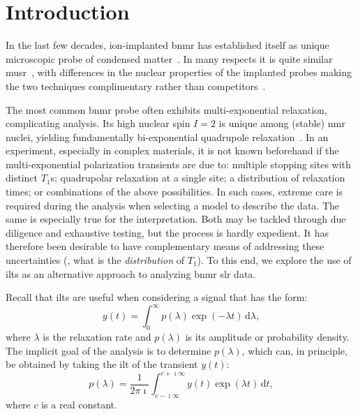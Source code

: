 \section{Introduction \label{sec:introduction}}

In the last few decades, ion-implanted \gls{bnmr} has established itself as unique microscopic probe of condensed matter~\cite{2015-MacFarlane-SSNMR-68-1}.
In many respects it is quite similar \gls{musr}~\cite{2004-Bakule-CP-45-203, 2011-Yaouanc-MSR},
with differences in the nuclear properties of the implanted probes making the two techniques complimentary rather than competitors~\cite{2000-Kiefl-PB-289-640}.

The most common \gls{bnmr} probe  often exhibits multi-exponential relaxation, complicating analysis.
Its high nuclear spin $I = 2$ is unique among (stable) \gls{nmr} nuclei, yielding fundamentally bi-exponential quadrupole relaxation~\cite{1970-Hubbard-JCP-53-985, 1982-Becker-ZNA-37-697, 1985-Korblein-JPFMP-15-561}.
In an experiment, especially in complex materials, it is not known beforehand if the multi-exponential polarization transients are due to:
multiple  stopping sites with distinct $T_{1}$s;
quadrupolar relaxation at a single site;
a distribution of relaxation times;
or combinations of the above possibilities.
In such cases, extreme care is required during the analysis when selecting a model to describe the data.
The same is especially true for the interpretation.
Both may be tackled through due diligence and exhaustive testing, but the process is hardly expedient.
It has therefore been desirable to have complementary means of addressing these uncertainties (, what is the \emph{distribution} of $T_{1}$).
To this end, we explore the use of \glspl{ilt} as an alternative approach to analyzing  \gls{bnmr} \gls{slr} data.

Recall that \glspl{ilt} are useful when considering a signal that has the form:
\begin{equation}
\label{eq:signal-integral}
   y(t) = \int_{0}^{\infty} p(\lambda) \exp ( - \lambda t) \, \mathrm{d} \lambda,
\end{equation}
where $\lambda$ is the relaxation rate and $p ( \lambda )$ is its amplitude or probability density.
The implicit goal of the analysis is to determine $p ( \lambda )$, which can, in principle, be obtained by taking the \gls{ilt} of the transient $y(t)$:
\begin{equation}
\label{eq:ilt}
   p ( \lambda ) = \frac{1}{2 \pi \imath} \int_{c - \imath \infty}^{c + \imath \infty} y(t) \exp ( \lambda t ) \, \mathrm{d} t ,
\end{equation}
where $c$ is a real constant.

